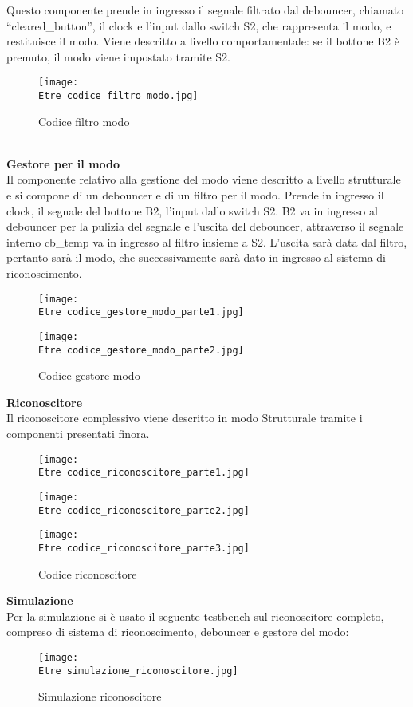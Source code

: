 \documentclass[12pt]{article}
\def \Etre {Allegati/Esercizio3/}
\begin{document}
Questo componente prende in ingresso il segnale filtrato dal debouncer, chiamato “cleared\_button”, il clock e l’input dallo switch S2, che rappresenta il modo, e restituisce il modo. Viene descritto a livello comportamentale:  se il bottone B2 è premuto, il modo viene impostato tramite S2.
\begin{figure}[ht]
    \centering
    \texttt{[image: \\Etre codice\_filtro\_modo.jpg]}
    \caption{Codice filtro modo}
\end{figure}
\\{\large \textbf{Gestore per il modo}}
\\Il componente relativo alla gestione del modo viene descritto a livello strutturale e si compone di un debouncer e di un filtro per il modo. Prende in ingresso il clock, il segnale del bottone B2, l’input dallo switch S2. B2 va in ingresso al debouncer per la pulizia del segnale e l’uscita del debouncer, attraverso il segnale interno cb\_temp va in ingresso al filtro insieme a S2. L’uscita sarà data dal filtro, pertanto sarà il modo, che successivamente sarà dato in ingresso al sistema di riconoscimento.
\begin{figure}[ht]
    \centering
    \texttt{[image: \\Etre codice\_gestore\_modo\_parte1.jpg]}
\end{figure}
\begin{figure}[ht!]
    \centering
    \texttt{[image: \\Etre codice\_gestore\_modo\_parte2.jpg]}
    \caption{Codice gestore modo}
\end{figure}
\clearpage
{\large \textbf {Riconoscitore}}
\\Il riconoscitore complessivo viene descritto in modo Strutturale tramite i componenti presentati finora.
\begin{figure}[ht!]
    \centering
    \texttt{[image: \\Etre codice\_riconoscitore\_parte1.jpg]}
\end{figure}
\begin{figure}[ht!]
    \centering
    \texttt{[image: \\Etre codice\_riconoscitore\_parte2.jpg]}
\end{figure}
\clearpage
\begin{figure}[ht!]
    \centering
    \texttt{[image: \\Etre codice\_riconoscitore\_parte3.jpg]}
    \caption{Codice riconoscitore}
\end{figure}
{\large \textbf{Simulazione}}
\\Per la simulazione si è usato il seguente testbench sul riconoscitore completo, compreso di sistema di riconoscimento, debouncer e gestore del modo:
\begin{figure}[ht!]
    \centering
    \texttt{[image: \\Etre simulazione\_riconoscitore.jpg]}
    \caption{Simulazione riconoscitore}
\end{figure}
\newpage
\end{document}
